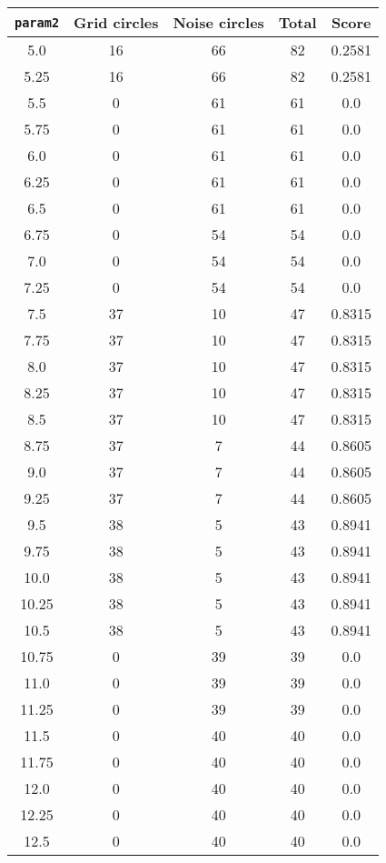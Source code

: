 \documentclass[letterpaper, 12pt]{article}
\begin{document}
\begin{longtable}{|c|c|c|c|c|}
\hline
\textbf{\texttt{param2}} & \textbf{Grid circles} & \textbf{Noise circles} & \textbf{Total} & \textbf{Score} \\
\hline
5.0 & 16 & 66 & 82 & 0.2581 \\
\hline
5.25 & 16 & 66 & 82 & 0.2581 \\
\hline
5.5 & 0 & 61 & 61 & 0.0 \\
\hline
5.75 & 0 & 61 & 61 & 0.0 \\
\hline
6.0 & 0 & 61 & 61 & 0.0 \\
\hline
6.25 & 0 & 61 & 61 & 0.0 \\
\hline
6.5 & 0 & 61 & 61 & 0.0 \\
\hline
6.75 & 0 & 54 & 54 & 0.0 \\
\hline
7.0 & 0 & 54 & 54 & 0.0 \\
\hline
7.25 & 0 & 54 & 54 & 0.0 \\
\hline
7.5 & 37 & 10 & 47 & 0.8315 \\
\hline
7.75 & 37 & 10 & 47 & 0.8315 \\
\hline
8.0 & 37 & 10 & 47 & 0.8315 \\
\hline
8.25 & 37 & 10 & 47 & 0.8315 \\
\hline
8.5 & 37 & 10 & 47 & 0.8315 \\
\hline
8.75 & 37 & 7 & 44 & 0.8605 \\
\hline
9.0 & 37 & 7 & 44 & 0.8605 \\
\hline
9.25 & 37 & 7 & 44 & 0.8605 \\
\hline
9.5 & 38 & 5 & 43 & 0.8941 \\
\hline
9.75 & 38 & 5 & 43 & 0.8941 \\
\hline
10.0 & 38 & 5 & 43 & 0.8941 \\
\hline
10.25 & 38 & 5 & 43 & 0.8941 \\
\hline
10.5 & 38 & 5 & 43 & 0.8941 \\
\hline
10.75 & 0 & 39 & 39 & 0.0 \\
\hline
11.0 & 0 & 39 & 39 & 0.0 \\
\hline
11.25 & 0 & 39 & 39 & 0.0 \\
\hline
11.5 & 0 & 40 & 40 & 0.0 \\
\hline
11.75 & 0 & 40 & 40 & 0.0 \\
\hline
12.0 & 0 & 40 & 40 & 0.0 \\
\hline
12.25 & 0 & 40 & 40 & 0.0 \\
\hline
12.5 & 0 & 40 & 40 & 0.0 \\

\end{longtable}
\end{document}

